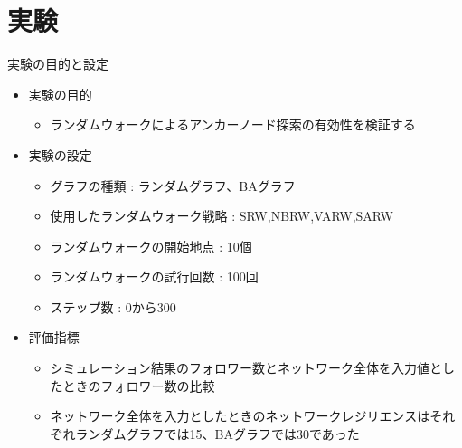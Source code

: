 \documentclass[compress,dvipdfmx,11pt]{beamer}
\begin{document}
\section{実験}
\label{sec:org7e13e3d}
\begin{frame}[label={sec:org03810a4}]{実験の目的と設定}
\begin{itemize}
\item 実験の目的
\begin{itemize}
\item ランダムウォークによるアンカーノード探索の有効性を検証する
\end{itemize}

\item 実験の設定
\begin{itemize}
\item グラフの種類 : ランダムグラフ、BAグラフ
\item 使用したランダムウォーク戦略 : SRW,NBRW,VARW,SARW
\item ランダムウォークの開始地点 : 10個
\item ランダムウォークの試行回数 : 100回
\item ステップ数 : 0から300
\end{itemize}

\item 評価指標
\begin{itemize}
\item シミュレーション結果のフォロワー数とネットワーク全体を入力値としたときのフォロワー数の比較
\item ネットワーク全体を入力としたときのネットワークレジリエンスはそれぞれランダムグラフでは15、BAグラフでは30であった
\end{itemize}
\end{itemize}
\end{frame}
\end{document}
